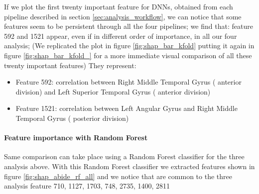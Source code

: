 \documentclass[10pt]{report}
\begin{document}
If we plot the first twenty important feature for DNNs, obtained from each pipeline described in section \ref{sec:analysis_workflow}, we can notice that some features seem to be persistent through all the four pipelines; we find that: feature 592 and 1521 appear, even if in different order of importance, in all our four analysis;
(We replicated the plot in figure \ref{fig:shap_bar_kfold} putting it again in figure \ref{fig:shap_bar_kfold_} for a more immediate visual comparison of all these twenty important features)
They represent:
\begin{itemize}
\item Feature 592: correlation between Right Middle Temporal Gyrus ( anterior division) and Left Superior Temporal Gyrus ( anterior division)
\item Feature 1521: correlation between Left Angular Gyrus  and Right Middle Temporal Gyrus ( posterior division)

\end{itemize}

\newpage
\paragraph{Feature importance with Random Forest}

Same comparison can take place using a Random Forest classifier for the three analysis above.
With this Random Forest classifier we extracted features shown in figure \ref{fig:shap_abide_rf_all} and we notice that are common to the three analysis feature 710, 1127, 1703, 748, 2735, 1400, 2811
\end{document}
